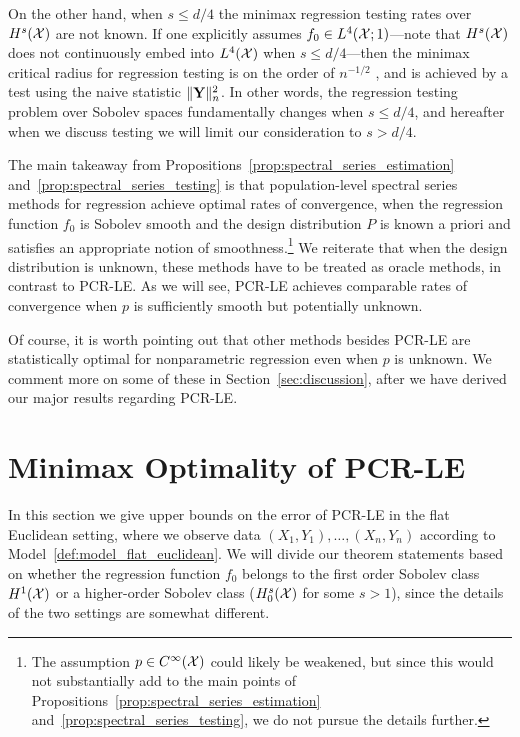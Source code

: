On the other hand, when $s \leq d/4$ the minimax regression testing rates over $H^s(\mathcal{X})$ are not known. If one explicitly assumes $f_0 \in L^4(\mathcal{X};1)$---note that $H^s(\mathcal{X})$ does not continuously embed into $L^4(\mathcal{X})$ when $s \leq d/4$---then the minimax critical radius for regression testing is on the order of $n^{-1/2}$ \citep{guerre02}, and is achieved by a test using the naive statistic $\|{\bf Y}\|_n^2$. In other words, the regression testing problem over Sobolev spaces fundamentally changes when $s \leq d/4$, and hereafter when we discuss testing we will limit our consideration to $s > d/4$. 

The main takeaway from Propositions~\ref{prop:spectral_series_estimation} and~\ref{prop:spectral_series_testing} is that population-level spectral series methods for regression achieve optimal rates of convergence, when the regression function $f_0$ is Sobolev smooth and the design distribution $P$ is known a priori and satisfies an appropriate notion of smoothness.\footnote{The assumption $p \in C^{\infty}(\mathcal{X})$ could likely be weakened, but since this would not substantially add to the main points of Propositions~\ref{prop:spectral_series_estimation} and~\ref{prop:spectral_series_testing}, we do not pursue the details further.} We reiterate that when the design distribution is unknown, these methods have to be treated as oracle methods, in contrast to PCR-LE. As we will see, PCR-LE achieves comparable rates of convergence when $p$ is sufficiently smooth but potentially unknown.

Of course, it is worth pointing out that other methods besides PCR-LE are statistically optimal for nonparametric regression even when $p$ is unknown. We comment more on some of these in Section~\ref{sec:discussion}, after we have derived our major results regarding PCR-LE.

\section{Minimax Optimality of PCR-LE}
\label{sec:minimax_optimal_laplacian_eigenmaps}

In this section we give upper bounds on the error of PCR-LE in the flat Euclidean setting, where we observe data $(X_1,Y_1),\ldots,(X_n,Y_n)$ according to Model~\ref{def:model_flat_euclidean}. We will divide our theorem statements based on whether the regression function $f_0$ belongs to the first order Sobolev class $H^1(\mathcal{X})$ or a higher-order Sobolev class ($H_0^{s}(\mathcal{X})$ for some $s > 1$), since the details of the two settings are somewhat different.

